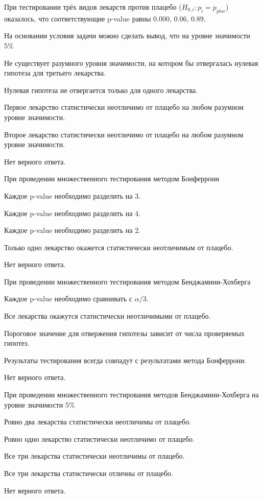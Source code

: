 \documentclass[10pt, a4paper]{exam}
\begin{document}
	При тестировании трёх видов лекарств против плацебо ($H_{0,i}: p_i = p_{plac}$) оказалось, что соответствующие p-value равны 0.000, 0.06, 0.89.
	
	\begin{questions}
		\question На основании условия задачи можно сделать вывод, что на уровне значимости 5\%
		\begin{choices}
			\item Не существует разумного уровня значимости, на котором бы отвергалась нулевая гипотеза для третьего лекарства.
			\item Нулевая гипотеза не отвергается только для одного лекарства. 
			\item Первое лекарство статистически неотличимо от плацебо на любом разумном уровне значимости.
			\item Второе лекарство статистически неотличимо от плацебо на любом разумном уровне значимости.
			\item Нет верного ответа.
		\end{choices}
	
		\question При проведении множественного тестирования методом Бонферрони
		\begin{choices}
			\item Каждое p-value необходимо разделить на 3.
			\item Каждое p-value необходимо разделить на 4.
			\item Каждое p-value необходимо разделить на 2.
			\item Только одно лекарство окажется статистически неотличимым от плацебо.
			\item Нет верного ответа.
		\end{choices}
	
		\question При проведении множественного тестирования методом Бенджамини-Хохберга
		\begin{choices}
			\item Каждое p-value необходимо сравнивать с $\alpha / 3$.
			\item Все лекарства окажутся статистически неотличимыми от плацебо.
			\item Пороговое значение для отвержения гипотезы зависит от числа проверяемых гипотез.
			\item Результаты тестирования всегда совпадут с результатами метода Бонферрони.
			\item Нет верного ответа.
		\end{choices}
	
		\question При проведении множественного тестирования методов Бенджамини-Хохберга на уровне значимости 5\%
		\begin{choices}
			\item Ровно два лекарства статистически неотличимы от плацебо.
			\item Ровно одно лекарство статистически неотличимо от плацебо.
			\item Все три лекарства статистически неотличимы от плацебо.
			\item Все три лекарства статистически отличны от плацебо.
			\item Нет верного ответа.
		\end{choices}
	\end{questions}
	
\end{document}
